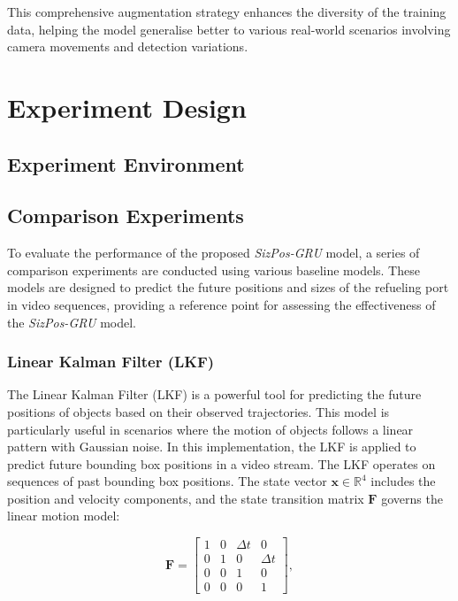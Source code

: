 \documentclass[12pt,oneside]{book} %
\begin{document}
This comprehensive augmentation strategy enhances the diversity of the training
data, helping the model generalise better to various real-world scenarios
involving camera movements and detection variations.

\chapter{Experiment Design}\label{chap:experiment_design}
\section{Experiment Environment}

\section{Comparison Experiments}
To evaluate the performance of the proposed \textit{SizPos-GRU} model, a series
of comparison experiments are conducted using various baseline models. These
models are designed to predict the future positions and sizes of the refueling
port in video sequences, providing a reference point for assessing the
effectiveness of the \textit{SizPos-GRU} model. 

\subsection*{Linear Kalman Filter (LKF)}
The Linear Kalman Filter (LKF) is a powerful tool for predicting the future
positions of objects based on their observed trajectories. This model is
particularly useful in scenarios where the motion of objects follows a linear
pattern with Gaussian noise. In this implementation, the LKF is applied to
predict future bounding box positions in a video stream. The LKF operates on
sequences of past bounding box positions. The state vector \(\mathbf{x} \in
\mathbb{R}^4\) includes the position and velocity components, and the state
transition matrix \(\mathbf{F}\) governs the linear motion model:

\[
    \mathbf{F} = \begin{bmatrix} 1 & 0 & \Delta t & 0 \\ 0 & 1 & 0 & \Delta t \\ 0 & 0 & 1 & 0 \\ 0 & 0 & 0 & 1 \end{bmatrix},
\]
\end{document}
